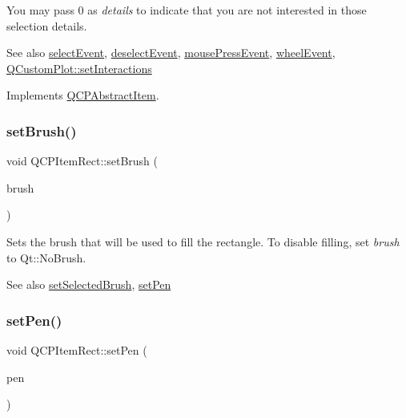 You may pass 0 as {\itshape details} to indicate that you are not interested in those selection details.

\begin{DoxySeeAlso}{See also}
\hyperlink{class_q_c_p_abstract_item_aa4b969c58797f39c9c0b6c07c7869d17}{select\+Event}, \hyperlink{class_q_c_p_abstract_item_af9093798cb07a861dcc73f93ca16c0c1}{deselect\+Event}, \hyperlink{class_q_c_p_layerable_af6567604818db90f4fd52822f8bc8376}{mouse\+Press\+Event}, \hyperlink{class_q_c_p_layerable_a47dfd7b8fd99c08ca54e09c362b6f022}{wheel\+Event}, \hyperlink{class_q_custom_plot_a5ee1e2f6ae27419deca53e75907c27e5}{Q\+Custom\+Plot\+::set\+Interactions} 
\end{DoxySeeAlso}


Implements \hyperlink{class_q_c_p_abstract_item_ae41d0349d68bb802c49104afd100ba2a}{Q\+C\+P\+Abstract\+Item}.

\mbox{\label{class_q_c_p_item_rect_abbd4e346a03513ee466afc25d9c75446}} 
\subsubsection{\texorpdfstring{set\+Brush()}{setBrush()}}
{\footnotesize\ttfamily void Q\+C\+P\+Item\+Rect\+::set\+Brush (\begin{DoxyParamCaption}\item[{const Q\+Brush \&}]{brush }\end{DoxyParamCaption})}

Sets the brush that will be used to fill the rectangle. To disable filling, set {\itshape brush} to Qt\+::\+No\+Brush.

\begin{DoxySeeAlso}{See also}
\hyperlink{class_q_c_p_item_rect_abd1792859844118dedee86223cede7af}{set\+Selected\+Brush}, \hyperlink{class_q_c_p_item_rect_a483c0da5a17e1646cd17ddea2c124e7d}{set\+Pen} 
\end{DoxySeeAlso}
\mbox{\label{class_q_c_p_item_rect_a483c0da5a17e1646cd17ddea2c124e7d}} 
\subsubsection{\texorpdfstring{set\+Pen()}{setPen()}}
{\footnotesize\ttfamily void Q\+C\+P\+Item\+Rect\+::set\+Pen (\begin{DoxyParamCaption}\item[{const Q\+Pen \&}]{pen }\end{DoxyParamCaption})}

